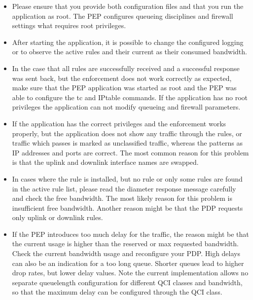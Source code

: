 \begin{itemize}
	\item Please ensure that you provide both configuration files and that you run the application as root. 
	The PEP configures queueing disciplines and firewall settings what requires root privileges.

	\item After starting the application, it is possible to change the configured logging or to observe the active rules and their current as their consumed bandwidth.
	
	\item In the case that all rules are successfully received and a successful response was sent back, but the enforcement does not work correctly as expected, make sure that the PEP application was started as root and the PEP was able to configure the tc and IPtable commands. If the application has no root privileges the application can not modify queueing and firewall parameters.

	\item If the application has the correct privileges and the enforcement works properly, but the application does not show any traffic through the rules, or traffic which passes is marked as unclassified traffic, whereas the patterns as IP addresses and ports are correct. The most common reason for this problem is that the uplink and downlink interface names are swapped.

	\item In cases where the rule is installed, but no rule or only some rules are found in the active rule list, please read the diameter response message carefully and check the free bandwidth. 
	The most likely reason for this problem is insufficient free bandwidth. 
	Another reason might be that the PDP requests only uplink or downlink rules.

	\item If the PEP introduces too much delay for the traffic, the reason might be that the current usage is higher than the reserved or max requested bandwidth. 
	Check the current bandwidth usage and reconfigure your PDP. 
	High delays can also be an indication for a too long queue.
	Shorter queues lead to higher drop rates, but lower delay values.
	Note the current implementation allows no separate queuelength configuration for different QCI classes and bandwidth, so that the maximum delay can be configured through the QCI class.
\end{itemize}
